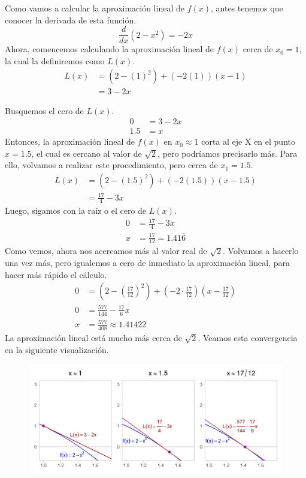 \documentclass[12pt]{article}
\begin{document}
Como vamos a calcular la aproximación lineal de $f(x)$, antes tenemos que conocer la derivada de esta función.
\[\frac{d}{dx} (2 - x^{2}) = -2x\]
Ahora, comencemos calculando la aproximación lineal de $f(x)$ cerca de $x_{0} = 1$, la cual la definiremos como $L(x)$.
\begin{align*}
L(x) &= (2 - (1)^{2}) + (-2(1))(x - 1) \\
     &= 3 - 2x
\end{align*}

\newpage

Busquemos el cero de $L(x)$.
\begin{align*}
0 &= 3 - 2x \\
1.5 &= x
\end{align*}
Entonces, la aproximación lineal de $f(x)$ en $x_{0} \approx 1$ corta al eje X en el punto $x = 1.5$, el cual es cercano al valor de $\sqrt{2}$, pero podríamos precisarlo más. Para ello, volvamos a realizar este procedimiento, pero cerca de $x_{1} = 1.5$.
\begin{align*}
L(x) &= (2 - (1.5)^{2}) + (-2(1.5))(x - 1.5) \\
     &= \frac{17}{4} - 3x
\end{align*}
Luego, sigamos con la raíz o el cero de $L(x)$.
\begin{align*}
0 &= \frac{17}{4} - 3x \\
x &= \frac{17}{12} = 1.41\bar{6}
\end{align*}
Como vemos, ahora nos acercamos más al valor real de $\sqrt{2}$. Volvamos a hacerlo una vez más, pero igualemos a cero de inmediato la aproximación lineal, para hacer más rápido el cálculo.
\begin{align*}
0 &= \left(2 - \left(\frac{17}{12}\right)^{2}\right)
     + \left(-2 \cdot \frac{17}{12}\right)
     \left(x - \frac{17}{12}\right) \\
0 &= \frac{577}{144} - \frac{17}{6}x \\
x &= \frac{577}{408} \approx 1.41422
\end{align*}
La aproximación lineal está mucho más cerca de $\sqrt{2}$. Veamos esta convergencia en la siguiente visualización.

\newpage

\begin{figure}[hbt!]
\centering
\includegraphics[scale=0.7]{img/newton_and_approx.jpg}
\end{figure}
\end{document}
